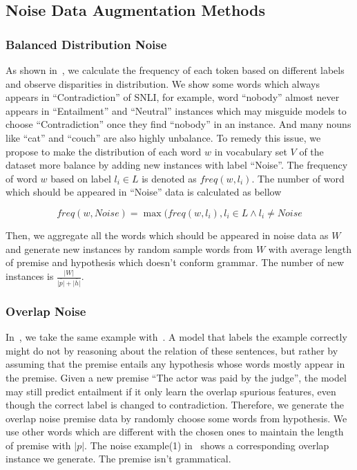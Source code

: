 \subsection{Noise Data Augmentation Methods}
\label{sec:noise_methods}

\subsubsection{Balanced Distribution Noise}


As shown in~, we calculate the frequency of 
each token based on different labels and observe disparities in distribution. 
We show some words which always appears in ``Contradiction'' of SNLI, 
for example, word ``nobody'' almost never appears 
in ``Entailment'' and ``Neutral'' instances which may misguide models to choose 
``Contradiction'' once they find ``nobody'' in an instance. And many nouns like ``cat'' and ``couch'' 
are also highly unbalance. To remedy this issue, we propose to 
make the distribution of each word $w$ in vocabulary set $V$ of the dataset more balance by adding 
new instances with label ``Noise''. The frequency of word $w$ based on label $l_{i}\in{L}$ is denoted as $freq(w, l_{i})$. 
The number of word which should be appeared in ``Noise'' data is calculated as bellow

 \begin{equation}
    freq(w, Noise) = \max(freq(w, l_{i}), l_{i}\in{L} \wedge l_{i}\neq{Noise}
\end{equation}

Then, we aggregate all the words which should be appeared in 
noise data as $W$ and generate new instances by random sample words from $W$ with 
average length of premise and hypothesis which doesn't conform grammar. 
The number of new instances is $\frac{|W|}{\bar{|p|}+\bar{|h|}}$.

\subsubsection{Overlap Noise}

In~, we take the same example with~\cite{mccoy2019right}.
A model that labels the example correctly
might do not by reasoning about the relation
of these sentences, but rather by assuming that the
premise entails any hypothesis whose words mostly 
appear in the premise. Given a new premise ``The actor was paid by the judge'', 
the model may still predict entailment if it only learn the overlap spurious features,
even though the correct label is changed to contradiction. Therefore, we generate 
the overlap noise premise data by randomly choose some words from hypothesis. 
We use other words which are different with the chosen ones to maintain 
the length of premise with $|p|$. The noise example(1) in~ shows 
a corresponding overlap instance we generate. The premise isn't grammatical.


